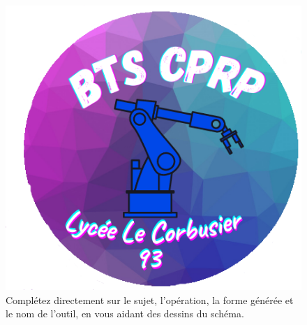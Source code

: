 \documentclass[12pt,a4paper]{article} %
\begin{document}
\begin{figure}[h]
\centering
\includegraphics[scale=0.75]{logo.png}
\caption{Complétez directement sur le sujet, l'opération, la forme générée et le nom de l'outil, en vous aidant des dessins du schéma.}
\label{exo1}
\end{figure}





\end{document}
